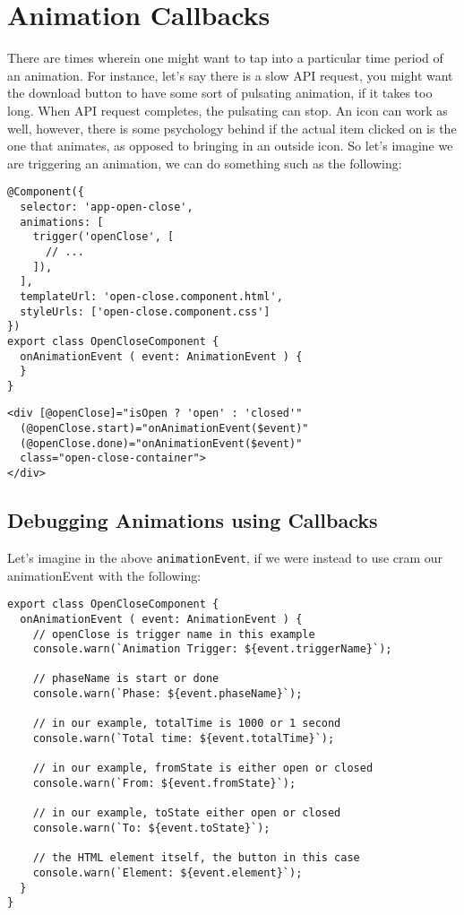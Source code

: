
\section{ Animation Callbacks }
There are times wherein one might want to tap into a particular time period of
an animation. For instance, let's say there is a slow API request, you might 
want the download button to have some sort of pulsating animation, if it takes
too long. When API request completes, the pulsating can stop. An icon can work 
as well, however, there is some psychology behind if the actual item clicked 
on is the one that animates, as opposed to bringing in an outside icon. So 
let's imagine we are triggering an animation, we can do something such as 
the following: 
\begin{lstlisting}[caption=open-close.component.ts]
@Component({
  selector: 'app-open-close',
  animations: [
    trigger('openClose', [
      // ...
    ]),
  ],
  templateUrl: 'open-close.component.html',
  styleUrls: ['open-close.component.css']
})
export class OpenCloseComponent {
  onAnimationEvent ( event: AnimationEvent ) {
  }
}  
\end{lstlisting}

\begin{lstlisting}[caption=open-close.component.html]
<div [@openClose]="isOpen ? 'open' : 'closed'"
  (@openClose.start)="onAnimationEvent($event)"
  (@openClose.done)="onAnimationEvent($event)"
  class="open-close-container">
</div>
\end{lstlisting}

\subsection{ Debugging Animations using Callbacks }
Let's imagine in the above \lstinline{animationEvent}, if we were instead to
use cram our animationEvent with the following: 
\begin{lstlisting}[caption=open-close.component.ts]
export class OpenCloseComponent {
  onAnimationEvent ( event: AnimationEvent ) {
    // openClose is trigger name in this example
    console.warn(`Animation Trigger: ${event.triggerName}`);

    // phaseName is start or done
    console.warn(`Phase: ${event.phaseName}`);

    // in our example, totalTime is 1000 or 1 second
    console.warn(`Total time: ${event.totalTime}`);

    // in our example, fromState is either open or closed
    console.warn(`From: ${event.fromState}`);

    // in our example, toState either open or closed
    console.warn(`To: ${event.toState}`);

    // the HTML element itself, the button in this case
    console.warn(`Element: ${event.element}`);
  }
}  
\end{lstlisting}

